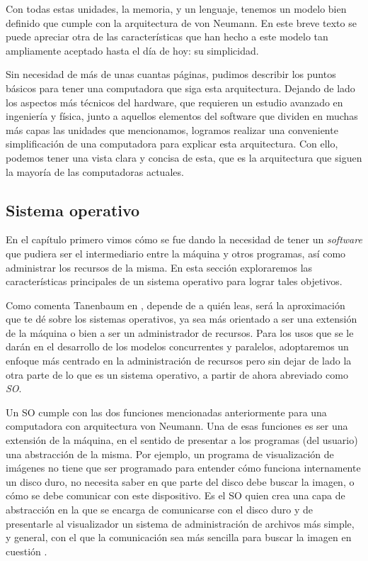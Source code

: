 \documentclass[letterpaper,12pt,oneside]{book}
\begin{document}
		Con todas estas unidades, la memoria, y un lenguaje, tenemos un modelo bien definido que cumple con la arquitectura de von Neumann. En este breve 
		texto se puede apreciar otra de las características que han hecho a este modelo tan ampliamente aceptado hasta el día de hoy: su simplicidad.

		Sin 
		necesidad
		de más de unas cuantas páginas, pudimos describir los puntos básicos para tener una computadora que siga esta arquitectura. Dejando de lado  los aspectos más técnicos del hardware, que requieren
		un estudio avanzado en ingeniería y física, junto a aquellos elementos del software que dividen en muchas más capas las unidades que mencionamos, logramos realizar una conveniente simplificación de una computadora para explicar esta arquitectura. Con ello, podemos
		tener una vista clara y concisa de esta, que es la arquitectura que siguen la mayoría de las computadoras actuales.		
		
		\subsection{Sistema operativo}   
		
		En el capítulo primero vimos cómo se fue dando la necesidad de tener un \textit{software} que pudiera ser el intermediario entre la máquina
		y otros programas, así como administrar los recursos de la misma. En esta sección exploraremos las características principales
		de un sistema operativo para lograr tales objetivos.
		
		Como comenta Tanenbaum en \cite{tanenbaum_modern_2002}, depende de a quién leas, será la aproximación que te dé sobre los sistemas operativos,
		ya sea más orientado a ser una extensión de la máquina o bien a ser un administrador de recursos. Para los usos que se le darán en el desarrollo
		de los modelos concurrentes y paralelos, adoptaremos un enfoque más centrado en la administración de recursos pero sin dejar de lado
		la otra parte de lo que es un sistema operativo, a partir de ahora abreviado como \textit{SO}.
		
		Un SO cumple con las dos funciones mencionadas anteriormente para una computadora con arquitectura von Neumann. Una
		de esas funciones es ser una extensión de la máquina, en el sentido de presentar a los programas (del usuario) una abstracción de la misma.
        Por ejemplo, un programa de visualización de imágenes no tiene que ser programado para entender cómo funciona internamente un disco 
		duro, no necesita saber en que parte del disco debe buscar la imagen, o cómo se debe comunicar con este dispositivo. Es el SO quien crea
		una capa de abstracción en la que se encarga de comunicarse con el disco duro y de presentarle al visualizador un sistema de administración de
		archivos más simple, y general, con el que la comunicación sea más sencilla para buscar la imagen en cuestión \cite{tanenbaum_modern_2002}.
  
\end{document}
